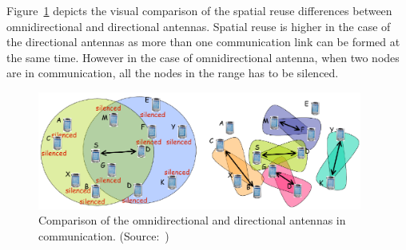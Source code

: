 \documentclass[12pt, oneandhalf, chaparabic, sees, ms]{metu}
\begin{document}
Figure~\ref{fig:spatial-reuse} depicts the visual comparison of the spatial reuse differences between 
omnidirectional and directional antennas. Spatial reuse is higher in the case of the directional antennas as more than one communication link
can be formed at the same time. However in the case of omnidirectional antenna, when two nodes are in communication, all the nodes in the range 
has to be silenced.
\vspace{-0.2cm}
% 
%
%
\begin{figure}[!htbp]
 \begin{center}
  \includegraphics[width=0.95\textwidth]{spatial-reuse.png}
 \end{center}
 \caption{Comparison of the omnidirectional and directional antennas in communication. (Source:~\protect\cite{choudhury2007})}
  \label{fig:spatial-reuse}
\end{figure}
% 
%
%
%
\vspace{-1.0cm}
\end{document}
